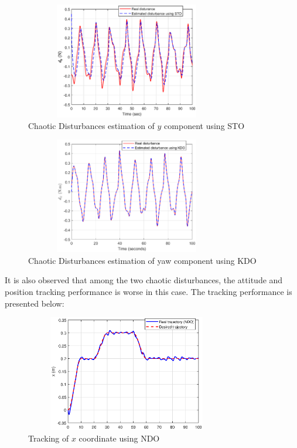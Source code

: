 \documentclass[letterpaper%
, twoside%
, 12pt%
,memoire%
, english%
,creativecommons,hyperref%
]{thETS}
\begin{document}
\begin{figure}[H]
\centering
\includegraphics[width=3.5in,height=2in]{Figures/results/chaotic_1_estimates/dis_m1_est_y_sto.eps}
\caption{Chaotic Disturbances estimation of $y$ component using STO}
\label{dis_m1_est_y_sto}
\end{figure}

\begin{figure}[H]
\centering
\includegraphics[width=3.5in,height=2in]{Figures/results/chaotic_1_estimates/dis_m1_est_yaw_kdo.eps}
\caption{Chaotic Disturbances estimation of yaw component using KDO}
\label{dis_m1_est_yaw_kdo}
\end{figure}

It is also observed that among the two chaotic disturbances, the attitude and position tracking performance is worse in this case. The tracking performance is presented below: 

\begin{figure}[H]
\centering
\includegraphics[width=3.5in,height=2in]{Figures/results/tracking/x_trac_dis_m1_ndo.eps}
\caption{Tracking of $x$ coordinate using NDO}
\label{x_trac_dis_m1_ndo}
\end{figure}
\end{document}
